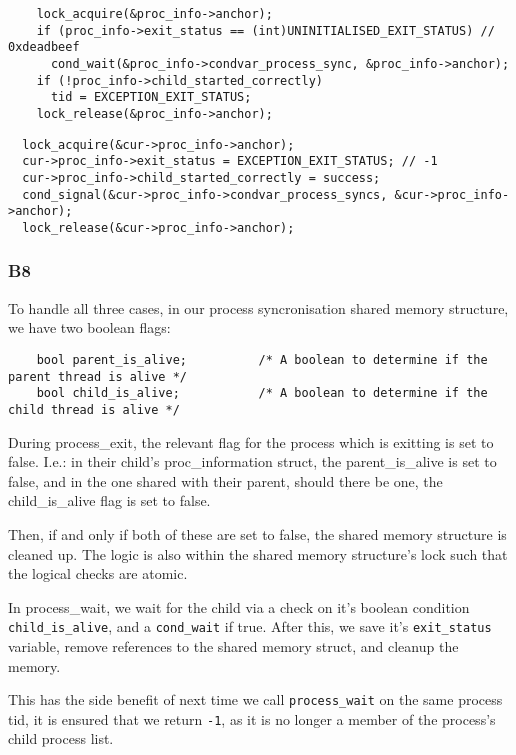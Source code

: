 \documentclass[a4wide, 11pt]{article}
\begin{document}
\begin{verbatim}
    lock_acquire(&proc_info->anchor);
    if (proc_info->exit_status == (int)UNINITIALISED_EXIT_STATUS) // 0xdeadbeef
      cond_wait(&proc_info->condvar_process_sync, &proc_info->anchor);
    if (!proc_info->child_started_correctly)
      tid = EXCEPTION_EXIT_STATUS;
    lock_release(&proc_info->anchor);
\end{verbatim}

\begin{verbatim}
  lock_acquire(&cur->proc_info->anchor);
  cur->proc_info->exit_status = EXCEPTION_EXIT_STATUS; // -1
  cur->proc_info->child_started_correctly = success;
  cond_signal(&cur->proc_info->condvar_process_syncs, &cur->proc_info->anchor);
  lock_release(&cur->proc_info->anchor);
\end{verbatim}

\subsubsection{B8}

To handle all three cases, in our process syncronisation shared memory structure, we have two boolean flags:

\begin{verbatim}
    bool parent_is_alive;          /* A boolean to determine if the parent thread is alive */
    bool child_is_alive;           /* A boolean to determine if the child thread is alive */
\end{verbatim}

During process\_exit, the relevant flag for the process which is exitting is set to false. I.e.: in their child's proc\_information struct, the parent\_is\_alive is set to false, and in the one shared with their parent, should there be one, the child\_is\_alive flag is set to false.

Then, if and only if both of these are set to false, the shared memory structure is cleaned up. The logic is also within the shared memory structure's lock such that the logical checks are atomic.

In process\_wait, we wait for the child via a check on it's boolean condition \texttt{child\_is\_alive}, and a \texttt{cond\_wait} if true. After this, we save it's \texttt{exit\_status} variable, remove references to the shared memory struct, and cleanup the memory.

This has the side benefit of next time we call \texttt{process\_wait} on the same process tid, it is ensured that we return \texttt{-1}, as it is no longer a member of the process's child process list.
\end{document}
